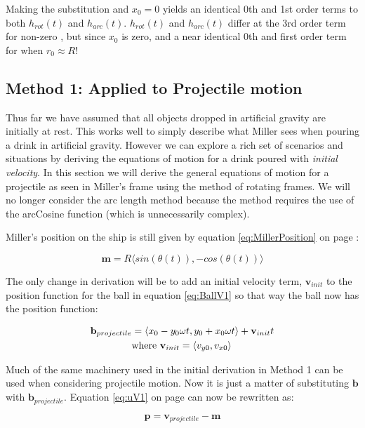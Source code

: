 \documentclass{amsart}
\renewcommand{\vec}{\textbf}
\theoremstyle{definition}
\begin{document}
Making the substitution  and $x_0 =0$ yields an identical 0th and 1st order terms to both $h_{rot}(t)$ and $h_{arc}(t)$. $h_{rot}(t)$ and $h_{arc}(t)$ differ at the 3rd order term for non-zero , but since $x_0$ is zero,  and a near identical 0th and first order term for  when $r_0 \approx R$! 


\subsection*{Method 1: Applied to Projectile motion}
Thus far we have assumed that all objects dropped in artificial
gravity are initially at rest. This works well to simply describe what
Miller sees when pouring a drink in artificial gravity. However we can
explore a rich set of scenarios and situations by deriving the
equations of motion for a drink poured with \textit{initial
  velocity}. In this section we will derive the general equations of
motion for a projectile as seen in Miller's frame using the method of
rotating frames. We will no longer consider the arc length method
because the method requires the use of the arcCosine function (which
is unnecessarily complex).


Miller's position on the ship is still given by equation
\ref{eq:MillerPosition} on page \pageref{eq:MillerPosition}:

\[\vec{m} = R\langle sin(\theta (t) ), - cos (\theta (t) ) \rangle\]

The only change in derivation will be to add an initial velocity term,
$\vec{v}_{init}$ to the position function for the ball in equation
\ref{eq:BallV1} so that way the ball now has the position function:

\begin{equation}\label{eq:BallProjectile}
\begin{split}
     \vec{b}_{projectile} &= \langle x_0 - y_0 \omega t, y_0 + x_0 \omega t \rangle + \vec{v}_{init}t \\ 
     &\textnormal{where } \vec{v}_{init} = \langle v_{y0},v_{x0} \rangle
\end{split}
\end{equation}

Much of the same machinery used in the initial derivation in Method 1
can be used when considering projectile motion. Now it is just a
matter of substituting $\vec{b}$ with $\vec{b}_{projectile}$. Equation
\ref{eq:uV1} on page \pageref{eq:uV1} can now be rewritten as:

\begin{equation}
    \vec{p} = \vec{v}_{projectile} - \vec{m}
\end{equation}
\end{document}
